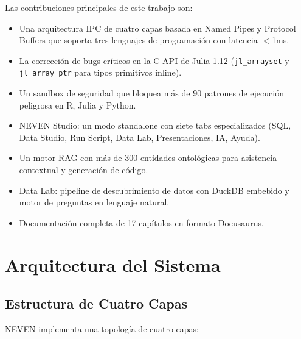 \documentclass[12pt, a4paper]{report}
\begin{document}
Las contribuciones principales de este trabajo son:
\begin{itemize}
    \item Una arquitectura IPC de cuatro capas basada en Named Pipes y Protocol Buffers que soporta tres lenguajes de programación con latencia $<$1ms.
    \item La corrección de bugs críticos en la C API de Julia 1.12 (\texttt{jl\_arrayset} y \texttt{jl\_array\_ptr} para tipos primitivos inline).
    \item Un sandbox de seguridad que bloquea más de 90 patrones de ejecución peligrosa en R, Julia y Python.
    \item NEVEN Studio: un modo standalone con siete tabs especializados (SQL, Data Studio, Run Script, Data Lab, Presentaciones, IA, Ayuda).
    \item Un motor RAG con más de 300 entidades ontológicas para asistencia contextual y generación de código.
    \item Data Lab: pipeline de descubrimiento de datos con DuckDB embebido y motor de preguntas en lenguaje natural.
    \item Documentación completa de 17 capítulos en formato Docusaurus.
\end{itemize}

\chapter{Arquitectura del Sistema}

\section{Estructura de Cuatro Capas}

NEVEN implementa una topología de cuatro capas:
\end{document}

